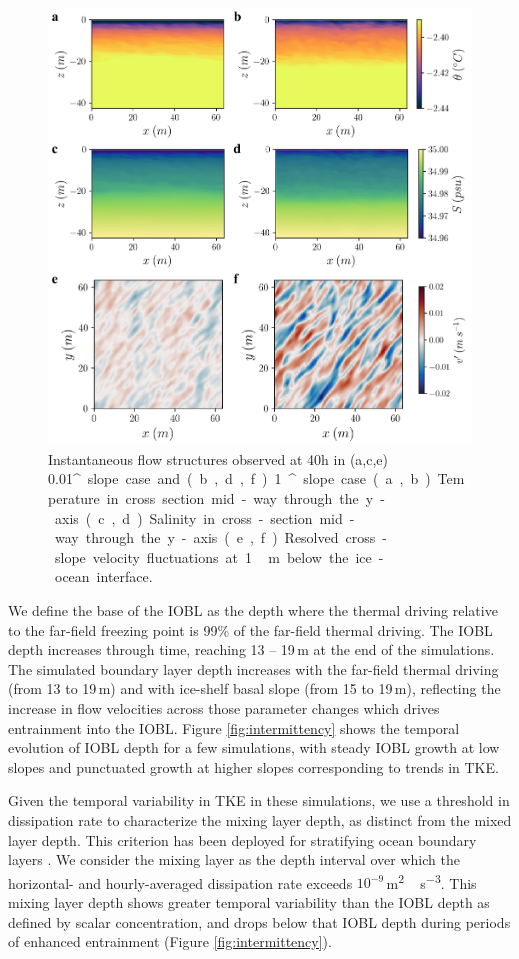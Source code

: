 \documentclass[tc, manuscript]{copernicus}
\begin{document}
\begin{figure}[t]
\includegraphics[width=12cm]{fig5.pdf}
\caption{Instantaneous flow structures observed at 40h in (a,c,e) 0.01\unit{^{\circ}} slope case and (b,d,f) 1\unit{^{\circ}} slope case. (a,b) Temperature in cross section mid-way through the y-axis. (c,d) Salinity in cross-section mid-way through the y-axis. (e,f) Resolved cross-slope velocity fluctuations at 1\,\unit{m} below the ice-ocean interface.}
\label{fig:cross-section}
\end{figure}

We define the base of the IOBL as the depth where the thermal driving relative to the far-field freezing point is 99\% of the far-field thermal driving. The IOBL depth increases through time, reaching 13 -- 19\,\unit{m} at the end of the simulations. The simulated boundary layer depth increases with the far-field thermal driving (from 13 to 19\,\unit{m}) and with ice-shelf basal slope (from 15 to 19\,\unit{m}), reflecting the increase in flow velocities across those parameter changes which drives entrainment into the IOBL. Figure \ref{fig:intermittency} shows the temporal evolution of IOBL depth for a few simulations, with steady IOBL growth at low slopes and punctuated growth at higher slopes corresponding to trends in TKE.

Given the temporal variability in TKE in these simulations, we use a threshold in dissipation rate to characterize the mixing layer depth, as distinct from the mixed layer depth. This criterion has been deployed for stratifying ocean boundary layers \citep{franks_has_2015, sutherland_mixed_2014}. We consider the mixing layer as the depth interval over which the horizontal- and hourly-averaged dissipation rate exceeds $10^{-9}$\,\unit{m^2\,s^{-3}}. This mixing layer depth shows greater temporal variability than the IOBL depth as defined by scalar concentration, and drops below that IOBL depth during periods of enhanced entrainment (Figure \ref{fig:intermittency}). 
\end{document}
